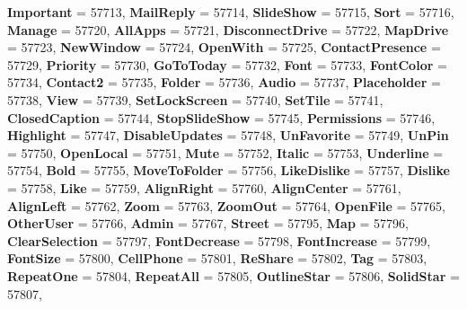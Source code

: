 \begin{DoxyCompactItemize}
{\bfseries Important} = 57713, 
{\bfseries Mail\+Reply} = 57714, 
{\bfseries Slide\+Show} = 57715, 
\newline
{\bfseries Sort} = 57716, 
{\bfseries Manage} = 57720, 
{\bfseries All\+Apps} = 57721, 
{\bfseries Disconnect\+Drive} = 57722, 
\newline
{\bfseries Map\+Drive} = 57723, 
{\bfseries New\+Window} = 57724, 
{\bfseries Open\+With} = 57725, 
{\bfseries Contact\+Presence} = 57729, 
\newline
{\bfseries Priority} = 57730, 
{\bfseries Go\+To\+Today} = 57732, 
{\bfseries Font} = 57733, 
{\bfseries Font\+Color} = 57734, 
\newline
{\bfseries Contact2} = 57735, 
{\bfseries Folder} = 57736, 
{\bfseries Audio} = 57737, 
{\bfseries Placeholder} = 57738, 
\newline
{\bfseries View} = 57739, 
{\bfseries Set\+Lock\+Screen} = 57740, 
{\bfseries Set\+Tile} = 57741, 
{\bfseries Closed\+Caption} = 57744, 
\newline
{\bfseries Stop\+Slide\+Show} = 57745, 
{\bfseries Permissions} = 57746, 
{\bfseries Highlight} = 57747, 
{\bfseries Disable\+Updates} = 57748, 
\newline
{\bfseries Un\+Favorite} = 57749, 
{\bfseries Un\+Pin} = 57750, 
{\bfseries Open\+Local} = 57751, 
{\bfseries Mute} = 57752, 
\newline
{\bfseries Italic} = 57753, 
{\bfseries Underline} = 57754, 
{\bfseries Bold} = 57755, 
{\bfseries Move\+To\+Folder} = 57756, 
\newline
{\bfseries Like\+Dislike} = 57757, 
{\bfseries Dislike} = 57758, 
{\bfseries Like} = 57759, 
{\bfseries Align\+Right} = 57760, 
\newline
{\bfseries Align\+Center} = 57761, 
{\bfseries Align\+Left} = 57762, 
{\bfseries Zoom} = 57763, 
{\bfseries Zoom\+Out} = 57764, 
\newline
{\bfseries Open\+File} = 57765, 
{\bfseries Other\+User} = 57766, 
{\bfseries Admin} = 57767, 
{\bfseries Street} = 57795, 
\newline
{\bfseries Map} = 57796, 
{\bfseries Clear\+Selection} = 57797, 
{\bfseries Font\+Decrease} = 57798, 
{\bfseries Font\+Increase} = 57799, 
\newline
{\bfseries Font\+Size} = 57800, 
{\bfseries Cell\+Phone} = 57801, 
{\bfseries Re\+Share} = 57802, 
{\bfseries Tag} = 57803, 
\newline
{\bfseries Repeat\+One} = 57804, 
{\bfseries Repeat\+All} = 57805, 
{\bfseries Outline\+Star} = 57806, 
{\bfseries Solid\+Star} = 57807, 

\end{DoxyCompactItemize}

